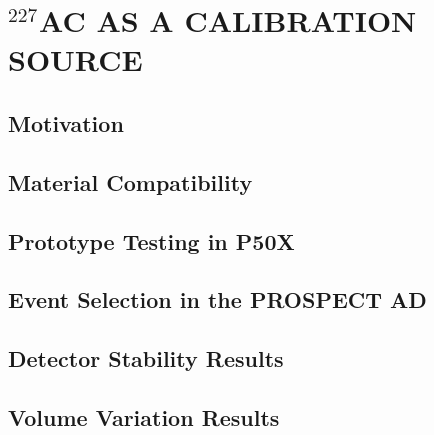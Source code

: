 \chapter{\uppercase{$^{227}$Ac as a Calibration Source}} \label{ch:Ac}

\section{Motivation}

\section{Material Compatibility}

\section{Prototype Testing in P50X}

\section{Event Selection in the PROSPECT AD}

\section{Detector Stability Results}

\section{Volume Variation Results}

